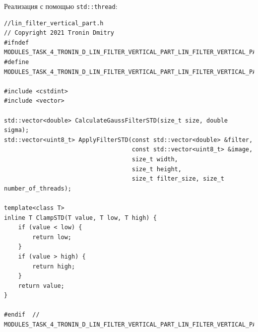\documentclass{report}
\begin{document}
Реализация с помощью \verb|std::thread|:

\begin{lstlisting}[breaklines=true]
//lin_filter_vertical_part.h
// Copyright 2021 Tronin Dmitry
#ifndef MODULES_TASK_4_TRONIN_D_LIN_FILTER_VERTICAL_PART_LIN_FILTER_VERTICAL_PART_H_
#define MODULES_TASK_4_TRONIN_D_LIN_FILTER_VERTICAL_PART_LIN_FILTER_VERTICAL_PART_H_

#include <cstdint>
#include <vector>

std::vector<double> CalculateGaussFilterSTD(size_t size, double sigma);
std::vector<uint8_t> ApplyFilterSTD(const std::vector<double> &filter,
                                    const std::vector<uint8_t> &image,
                                    size_t width,
                                    size_t height,
                                    size_t filter_size, size_t number_of_threads);

template<class T>
inline T ClampSTD(T value, T low, T high) {
    if (value < low) {
        return low;
    }
    if (value > high) {
        return high;
    }
    return value;
}

#endif  // MODULES_TASK_4_TRONIN_D_LIN_FILTER_VERTICAL_PART_LIN_FILTER_VERTICAL_PART_H_
\end{lstlisting}
\end{document}
